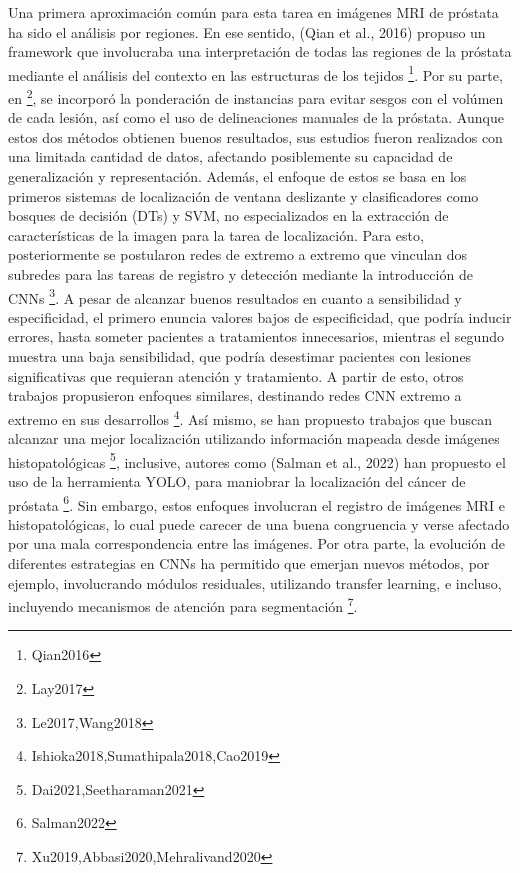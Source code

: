 Una primera aproximación común para esta tarea en imágenes MRI de próstata ha sido el análisis por regiones. En ese sentido, (Qian et al., 2016) propuso un framework que involucraba una interpretación de todas las regiones de la próstata mediante el análisis del contexto en las estructuras de los tejidos \footnote{Qian2016}. Por su parte, en \footnote{Lay2017}, se incorporó la ponderación de instancias para evitar sesgos con el volúmen de cada lesión, así como el uso de delineaciones manuales de la próstata.  Aunque estos dos métodos obtienen buenos resultados, sus estudios fueron realizados con una limitada cantidad de datos, afectando posiblemente su capacidad de generalización y representación. Además, el enfoque de estos se basa en los primeros sistemas de localización de ventana deslizante y clasificadores como bosques de decisión (DTs) y SVM, no especializados en la extracción de características de la imagen para la tarea de localización. Para esto, posteriormente se postularon redes de extremo a extremo que vinculan dos subredes para las tareas de registro y detección mediante la introducción de CNNs \footnote{Le2017,Wang2018}. A pesar de alcanzar buenos resultados en cuanto a sensibilidad y especificidad, el primero enuncia valores bajos de especificidad, que podría inducir errores, hasta someter pacientes a tratamientos innecesarios, mientras el segundo muestra una baja sensibilidad, que podría desestimar pacientes con lesiones significativas que requieran atención y tratamiento. A partir de esto, otros trabajos propusieron enfoques similares, destinando redes CNN extremo a extremo en sus desarrollos \footnote{Ishioka2018,Sumathipala2018,Cao2019}. Así mismo, se han propuesto trabajos que buscan alcanzar una mejor localización utilizando información mapeada desde imágenes histopatológicas \footnote{Dai2021,Seetharaman2021}, inclusive, autores como (Salman et al., 2022) han propuesto el uso de la herramienta YOLO, para maniobrar la localización del cáncer de próstata \footnote{Salman2022}. Sin embargo, estos enfoques involucran el registro de imágenes MRI e histopatológicas, lo cual puede carecer de una buena congruencia y verse afectado por una mala correspondencia entre las imágenes. Por otra parte, la evolución de diferentes estrategias en CNNs ha permitido que emerjan nuevos métodos, por ejemplo, involucrando módulos residuales, utilizando transfer learning, e incluso, incluyendo mecanismos de atención para segmentación \footnote{Xu2019,Abbasi2020,Mehralivand2020}. 
